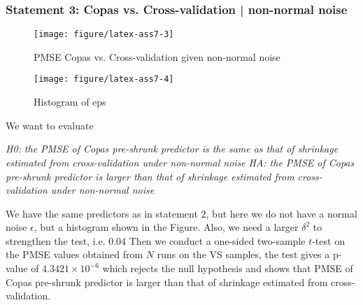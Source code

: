 \documentclass{article}\usepackage{graphicx, color}
\makeatletter
\def\maxwidth{ %
  \ifdim\Gin@nat@width>\linewidth
    \linewidth
  \else
    \Gin@nat@width
  \fi
}
\newenvironment{knitrout}{}{} %
\makeatother
\begin{document}
\subsubsection*{Statement 3: Copas vs. Cross-validation | non-normal
  noise}
\begin{knitrout}
\color{fgcolor}\begin{figure}[]


{\centering \texttt{[image: figure/latex-ass7-3]} 

}

\caption[PMSE Copas vs]{PMSE Copas vs. Cross-validation given non-normal noise\label{fig:ass7-3}}
\end{figure}


\end{knitrout}


\begin{knitrout}
\color{fgcolor}\begin{figure}[]


{\centering \texttt{[image: figure/latex-ass7-4]} 

}

\caption[Histogram of eps]{Histogram of eps\label{fig:ass7-4}}
\end{figure}


\end{knitrout}

\hspace{12 pt}  We want to evaluate


\hspace{12 pt} \textit{H0: the PMSE of Copas pre-shrunk predictor is
  the same as that of shrinkage estimated from cross-validation under
  non-normal noise} \newline
\vspace{2 pt}
\hspace{24 pt} \textit{HA: the PMSE of Copas pre-shrunk predictor is
  larger than that of shrinkage estimated from cross-validation under
  non-normal noise} \newline


We have the same predictors as in statement 2, but here we do not have
a normal noise $\epsilon$, but a histogram shown in the Figure. Also,
we need a larger $\delta^2$ to strengthen the test, i.e. 0.04
Then we conduct a one-sided two-sample $t$-test on the PMSE values obtained
from $N$ runs on the VS samples, the test gives a p-value of 
\ensuremath{4.3421\times 10^{-6}}
which rejects the null hypothesis and shows that PMSE of Copas
pre-shrunk predictor is larger than that of shrinkage estimated from cross-validation.
\end{document}

